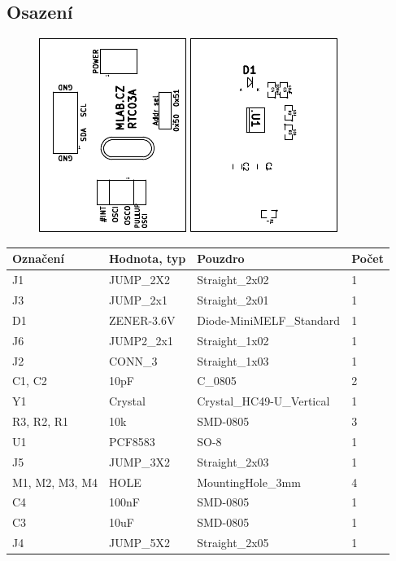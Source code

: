 \subsection{Osazení}


\begin{figure}[ht!]
	\centering
	\includegraphics[scale=2]{../../hw/cam_profi/RTC03A-top_cropped.pdf}
	\qquad
	\includegraphics[scale=2]{../../hw/cam_profi/RTC03A-bottom_cropped.pdf}
\end{figure}

\begin{center}
  \begin{tabular}{ | l | l | l | l |}
    \hline
    Označení & Hodnota, typ & Pouzdro & Počet \\ \hline
    \hline
			J1 & JUMP\_2X2 & Straight\_2x02 & 1\\ \hline
			J3 & JUMP\_2x1 & Straight\_2x01 & 1\\ \hline
			D1 & ZENER-3.6V & Diode-MiniMELF\_Standard & 1\\ \hline
			J6 & JUMP2\_2x1 & Straight\_1x02 & 1\\ \hline
			J2 & CONN\_3 & Straight\_1x03 & 1\\ \hline
			C1, C2 & 10pF & C\_0805 & 2\\ \hline
			Y1 & Crystal & Crystal\_HC49-U\_Vertical & 1\\ \hline
			R3, R2, R1 & 10k & SMD-0805 & 3\\ \hline
			U1 & PCF8583 & SO-8 & 1\\ \hline
			J5 & JUMP\_3X2 & Straight\_2x03 & 1\\ \hline
			M1, M2, M3, M4 & HOLE & MountingHole\_3mm & 4\\ \hline
			C4 & 100nF & SMD-0805 & 1\\ \hline
			C3 & 10uF & SMD-0805 & 1\\ \hline
			J4 & JUMP\_5X2 & Straight\_2x05 & 1\\ \hline
	
  \end{tabular}
\end{center}